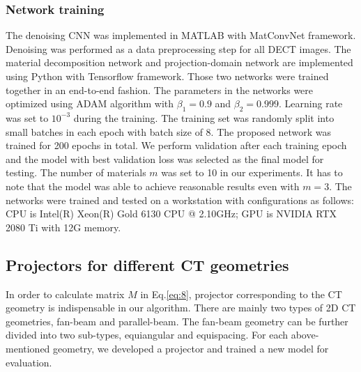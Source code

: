 \documentclass[journal,twoside,web]{ieeecolor}
\begin{document}
\subsubsection{Network training}
The denoising CNN was implemented in MATLAB with MatConvNet framework\cite{ref47}. Denoising was performed as a data preprocessing step for all DECT images. The material decomposition network and projection-domain network are implemented using Python with Tensorflow framework\cite{ref48}. Those two networks were trained together in an end-to-end fashion. The parameters in the networks were optimized using ADAM algorithm\cite{ref49} with \(\beta_1=0.9\) and \(\beta_2=0.999\). Learning rate was set to \(10^{-3}\) during the training. The training set was randomly split into small batches in each epoch with batch size of 8. The proposed network was trained for 200 epochs in total. We perform validation after each training epoch and the model with best validation loss was selected as the final model for testing. The number of materials \(m\) was set to 10 in our experiments. It has to note that the model was able to achieve reasonable results even with \(m=3\). The networks were trained and tested on a workstation with configurations as follows: CPU is Intel(R) Xeon(R) Gold 6130 CPU @ 2.10GHz; GPU is NVIDIA RTX 2080 Ti with 12G memory.

\subsection{Projectors for different CT geometries}
In order to calculate matrix \(M\) in Eq.\eqref{eq:8}, projector corresponding to the CT geometry is indispensable in our algorithm. There are mainly two types of 2D CT geometries, fan-beam and parallel-beam. The fan-beam geometry can be further divided into two sub-types, equiangular and equispacing. For each above-mentioned geometry, we developed a projector and trained a new model for evaluation.
\end{document}
